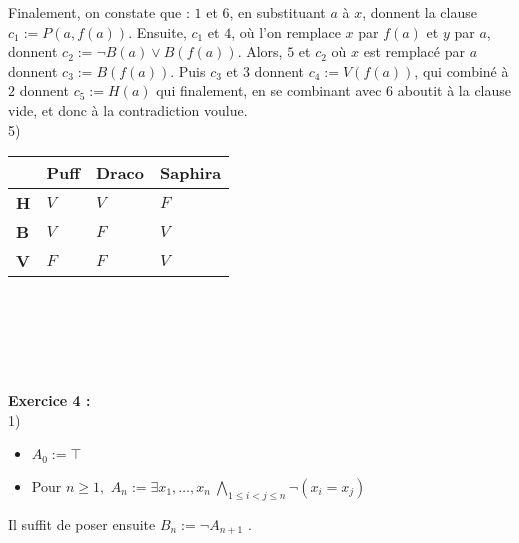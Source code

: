 \documentclass[11pt,a4paper]{article}
\begin{document}
Finalement, on constate que : $1$ et $6$, en substituant $a$ à $x$, donnent la clause $c_1 := P(a,f(a))$. Ensuite, $c_1$ et $4$, où l'on remplace $x$ par $f(a)$ et $y$ par $a$, donnent $c_2 := \lnot B(a) \lor B(f(a))$. Alors, $5$ et $c_2$ où $x$ est remplacé par $a$ donnent $c_3 := B(f(a))$. Puis $c_3$ et $3$ donnent $c_4 := V(f(a))$, qui combiné à $2$ donnent $c_5 := H(a)$ qui finalement, en se combinant avec $6$ aboutit à la clause vide, et donc à la contradiction voulue. \\ 

5) 
\begin{tabular}{|C{1cm}|C{1cm}|C{1cm}|C{1.2cm}|}
  \hline
   & Puff & Draco & Saphira \\
  \hline
  \textbf{H} & $V$ & $V$ & $F$ \\
  \hline
  \textbf{B} & $V$ & $F$ & $V$ \\
  \hline 
  \textbf{V} & $F$ & $F$ & $V$ \\
  \hline
\end{tabular}
\\
\\
\\
\\
\\

\textbf{Exercice 4 :} \\

1) \begin{itemize}
\item $A_0:=\top$
\item Pour $n \geq 1, $ $\displaystyle A_n := \exists x_1,\dots,x_n \ \bigwedge_{1\leq i<j \leq n}\lnot(x_i=x_j)$
\end{itemize} 
Il suffit de poser ensuite $B_n := \lnot A_{n+1}$ . \\
\end{document}
